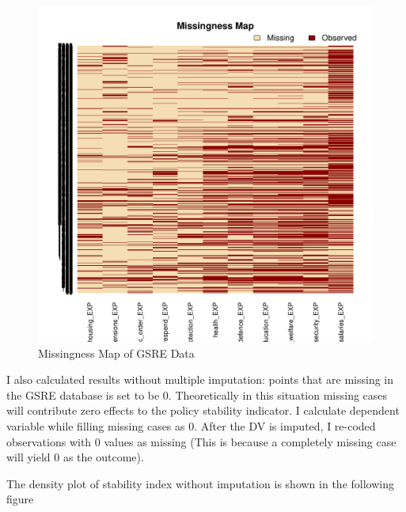 \documentclass[12pt]{article}\usepackage[]{graphicx}\usepackage[]{color}
\makeatletter
\def\maxwidth{ %
  \ifdim\Gin@nat@width>\linewidth
    \linewidth
  \else
    \Gin@nat@width
  \fi
}
\newenvironment{knitrout}{}{} %
\makeatother
\begin{document}
\begin{figure}
\begin{knitrout}
\color{fgcolor}
\includegraphics[width=\maxwidth]{figure/map-1} 

\end{knitrout}
\caption{Missingness Map of GSRE Data}
\label{figmiss}
\end{figure}


I also calculated results without multiple imputation: points that are missing in the GSRE database is set to be 0. Theoretically in this situation missing cases will contribute zero effects to the policy stability indicator. I calculate dependent variable while filling missing cases as 0. After the DV is imputed, I re-coded observations with 0 values as missing (This is because a completely missing case will yield 0 as the outcome). 




The density plot of stability index without imputation is shown in the following figure
\end{document}
